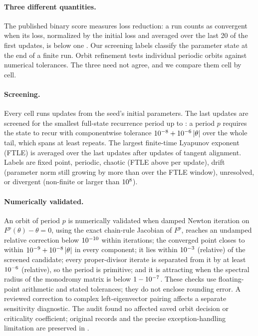 \documentclass[11pt,letterpaper]{article}
\begin{document}
\paragraph{Three different quantities.} The published binary score measures loss reduction: a run counts as
convergent when its loss, normalized by the initial loss and averaged over the last 20 of the first
\nScoreHorizon{} updates, is below one \citep{sohldickstein2024}. Our screening labels classify the parameter state
at the end of a finite run. Orbit refinement tests individual periodic orbits against numerical tolerances. The three need not agree, and we
compare them cell by cell.

\paragraph{Screening.} Every cell runs \nUpdates{} updates from the seed's initial parameters. The last \nTail{}
updates are screened for the smallest full-state recurrence period up to \nMaxPeriod{}: a period $p$ requires the
state to recur with componentwise tolerance $10^{-8} + 10^{-6}\,|\theta|$ over the whole tail, which
spans at least \nMinRepeats{} repeats. The largest finite-time Lyapunov exponent (FTLE) is averaged over the last
\nFtleSteps{} updates after \nFtleAlign{} updates of tangent alignment. Labels are fixed point, periodic, chaotic
(FTLE above \nChaosThreshold{} per update), drift (parameter norm still growing by more than \pDrift{} over the FTLE
window), unresolved, or divergent (non-finite or larger than $10^{8}$).

\paragraph{Numerically validated.} An orbit of period $p$ is numerically validated when damped Newton iteration
on $F^p(\theta)-\theta=0$, using the exact chain-rule Jacobian of $F^p$, reaches an undamped relative correction
below $10^{-10}$ within \nCertIterations{} iterations; the converged point closes to within
$10^{-9} + 10^{-8}\,|\theta|$ in every component; it lies within $10^{-3}$ (relative) of the
screened candidate; every proper-divisor iterate is separated from it by at least $10^{-6}$ (relative), so
the period is primitive; and it is attracting when the spectral radius of the monodromy matrix is below
$1-10^{-7}$. These checks use floating-point arithmetic and stated tolerances; they do not enclose rounding error.
A reviewed correction to complex left-eigenvector pairing affects a separate sensitivity diagnostic. The
audit found no affected saved orbit decision or criticality coefficient; original records and the precise
exception-handling limitation are preserved in .
\end{document}
